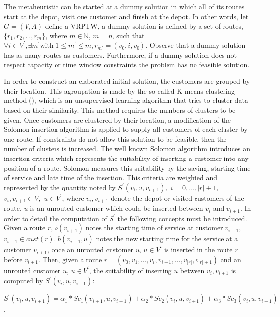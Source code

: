 The metaheuristic can be started at a dummy solution in which all of its routes start at the depot, visit one customer and finish at the depot. In other words, let $G=(V,A)$ define a VRPTW, a dummy solution is defined by a set of routes, $\{r_{1},r_{2},\dots,r_{m} \}$, where $m \in \mathbb{N}$, $ m = n$, such that $\forall i \in V^{'}, \exists m^{'} \text{with } 1\leq m^{'}\leq m, r_{ m^{'}}=(v_{0},i,v_{0})$. Observe that a dummy solution has as many routes as customers. Furthermore, if a dummy solution does not respect capacity or time window constraints the problem has no feasible solution. %

In order to construct an elaborated initial solution, the customers are grouped by their location. This agroupation is made by the so-called K-means clustering method (\cite{cluster}), which is an unsupervised learning algorithm that tries to cluster data based on their similarity. This method requires the numbers of clusters to be given. Once customers are clustered by their location, a modification of the Solomon insertion algorithm is applied to supply all customers of each cluster by one route. If constraints do not allow this solution to be feasible, then the number of clusters is increased. The well known Solomon algorithm introduces an insertion criteria which represents the suitability of inserting a customer into any position of a route. Solomon measures this suitability by the saving, starting time of service and late time of the insertion. This criteria are weighted and represented by the quantity noted by $S^{'}(v_i,u,v_{i+1}),$ $i=0, \dots, |r|+1$, $v_{i}, v_{i+1}\in V,$ $u \in V^{'}$, where $v_{i},v_{i+1}$ denote the depot or visited customers of the route. $u$ is an unrouted customer which could be inserted between $v_i$ and $v_{i+1}$. In order to detail the computation of $S^{'}$ the following concepts must be introduced. Given a route $r$, $b(v_{i+1})$ notes the starting time of service at customer $v_{i+1}$, $v_{i+1} \in cust(r)$. $b(v_{i+1},u)$ notes the new starting time for the service at a customer $v_{i+1}$, once an unrouted customer $u$, $u\in V^{'}$ is inserted in the route $r$ before $v_{i+1}$. Then, given a route $r = (v_{0},v_{1}, \dots, v_{i}, v_{i+1}, \dots,v_{|r|},v_{|r|+1} ) $ and an unrouted customer $u$, $u\in V^{'}$, the suitability of inserting $u$ between $v_{i},v_{i+1}$ is computed by $S^{'}(v_{i},u,v_{i+1})$:

$S^{'}(v_{i},u,v_{i+1}) = \alpha_{1}*Sc_{1}(v_{i+1},u,v_{i+1}) + \alpha_{2}*Sc_{2}(v_{i},u,v_{i+1}) + \alpha_{3}*Sc_{3}(v_{i},u,v_{i+1})$,

